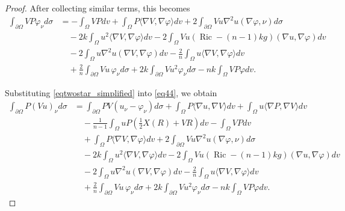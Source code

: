 \documentclass[reqno,11pt]{amsart}
\numberwithin{equation}{section}  %
\begin{document}
\begin{proof}
After collecting similar terms, this becomes
\begin{align}
\int_{\partial\Omega}VP\varphi_{\nu} d\sigma
&=
-\int_{\Omega}VP dv
+
\int_{\Omega}P\langle\nabla V,\nabla\varphi\rangle dv
+
2\int_{\partial\Omega}Vu\nabla^{2}u(\nabla\varphi,\nu) d\sigma
\nonumber\\
&\quad
-
2k\int_{\Omega}u^{2}\langle\nabla V,\nabla\varphi\rangle dv
-
2\int_{\Omega}Vu(\operatorname{Ric}-(n-1)kg)(\nabla u,\nabla\varphi) dv
\nonumber\\
&\quad
-
2\int_{\Omega}u\nabla^{2}u(\nabla V,\nabla\varphi) dv
-
\frac{2}{n}\int_{\Omega}u\langle\nabla V,\nabla\varphi\rangle dv
\nonumber\\
&\quad
+
\frac{2}{n}\int_{\partial\Omega}Vu\,\varphi_{\nu} d\sigma
+
2k\int_{\partial\Omega}Vu^{2}\varphi_{\nu} d\sigma
-
nk\int_{\Omega}VP\varphi dv.
\label{eqtwostar_simplified}
\end{align}

Substituting \eqref{eqtwostar_simplified} into \eqref{eq44}, we obtain
\begin{align}\label{eqstar44}
\int_{\partial\Omega}P(Vu)_{\nu}d\sigma
&=
\int_{\partial\Omega}PV(u_{\nu}-\varphi_{\nu})d\sigma
+
\int_{\Omega}P\langle\nabla u,\nabla V\rangle dv
+
\int_{\Omega}u\langle\nabla P,\nabla V\rangle dv
\nonumber\\
&\quad
-
\frac{1}{n-1}
\int_{\Omega}uP\left(\frac{1}{2}X(R)+VR\right)dv
-
\int_{\Omega}VP dv
\nonumber\\
&\quad
+
\int_{\Omega}P\langle\nabla V,\nabla\varphi\rangle dv
+
2\int_{\partial\Omega}Vu\nabla^{2}u(\nabla\varphi,\nu) d\sigma
\nonumber\\
&\quad
-
2k\int_{\Omega}u^{2}\langle\nabla V,\nabla\varphi\rangle dv
-
2\int_{\Omega}Vu(\operatorname{Ric}-(n-1)kg)(\nabla u,\nabla\varphi) dv
\nonumber\\
&\quad
-
2\int_{\Omega}u\nabla^{2}u(\nabla V,\nabla\varphi)dv
-
\frac{2}{n}\int_{\Omega}u\langle\nabla V,\nabla\varphi\rangle dv
\nonumber\\
&\quad
+
\frac{2}{n}\int_{\partial\Omega}Vu\,\varphi_{\nu}d\sigma
+
2k\int_{\partial\Omega}Vu^{2}\varphi_{\nu}d\sigma
-
nk\int_{\Omega}VP\varphi dv.
\end{align}


\end{proof}
\end{document}
